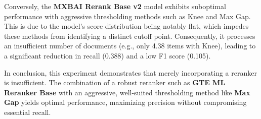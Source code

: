 Conversely, the \textbf{MXBAI Rerank Base v2} model exhibits suboptimal performance with aggressive thresholding methods such as Knee and Max Gap. This is due to the model's score distribution being notably flat, which impedes these methods from identifying a distinct cutoff point. Consequently, it processes an insufficient number of documents (e.g., only 4.38 items with Knee), leading to a significant reduction in recall (0.388) and a low F1 score (0.105).

In conclusion, this experiment demonstrates that merely incorporating a reranker is insufficient. The combination of a robust reranker such as \textbf{GTE ML Reranker Base} with an aggressive, well-suited thresholding method like \textbf{Max Gap} yields optimal performance, maximizing precision without compromising essential recall.


